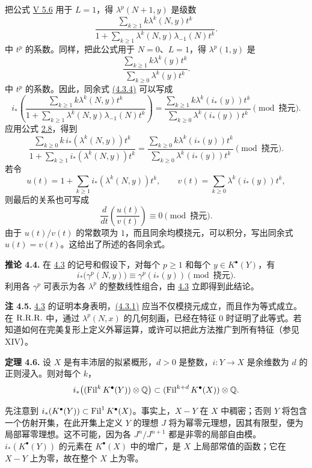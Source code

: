 把公式 \hyperlink{sga6.e05.para.5-6}{V 5.6} 用于 \(L=1\)，得 \(\lambda^p(N+1,y)\) 是级数
\[
  \frac{\sum_{k\ge1}k\lambda^k(N,y)t^k}
       {1+\sum_{k\ge1}\lambda^k(N,y)\lambda_{-1}(N)t^k}.
\]
中 \(t^p\) 的系数。同样，把此公式用于 \(N=0\)、\(L=1\)，得 \(\lambda^p(1,y)\) 是
\[
  \frac{\sum_{k\ge1}k\lambda^k(y)t^k}
       {\sum_{k\ge0}\lambda^k(y)t^k}.
\]
中 \(t^p\) 的系数。因此，同余式 \hyperlink{sga6.e07.eq.4-3-4}{(4.3.4)} 可以写成
\[
i_*\left(
  \frac{\sum_{k\ge1}k\lambda^k(N,y)t^k}
       {1+\sum_{k\ge1}\lambda^k(N,y)\lambda_{-1}(N)t^k}
\right)
=
  \frac{\sum_{k\ge1}k\lambda^k(i_*(y))t^k}
       {\sum_{k\ge0}\lambda^k(i_*(y))t^k}
       \pmod{\text{挠元}}.
\]
应用公式 \hyperlink{sga6.e07.cor.2-8}{2.8}，得到
\[
  \frac{\sum_{k\ge0}k\,i_*(\lambda^k(N,y))t^k}
       {1+\sum_{k\ge1} i_*(\lambda^k(N,y))t^k}
  =
  \frac{\sum_{k\ge0}k\lambda^k(i_*(y))t^k}
       {\sum_{k\ge0}\lambda^k(i_*(y))t^k}
       \pmod{\text{挠元}}.
\]
若令
\[
  u(t)=1+\sum_{k\ge1}i_*(\lambda^k(N,y))t^k,\qquad
  v(t)=\sum_{k\ge0}\lambda^k(i_*(y))t^k,
\]
则最后的关系也可写成
\[
  \frac{d}{dt}\!\left(\frac{u(t)}{v(t)}\right)\equiv0
  \pmod{\text{挠元}}.
\]
由于 \(u(t)/v(t)\) 的常数项为 \(1\)，而且同余均模挠元，可以积分，写出同余式 \(u(t)=v(t)\)。这给出了所述的各同余式。

\textbf{推论 4.4.} 在 \hyperlink{sga6.e07.thm.4-3}{4.3} 的记号和假设下，对每个 \(p\ge1\) 和每个 \(y\in K^\bullet(Y)\)，有
\[
  i_*\bigl(\gamma^p(N,y)\bigr)\equiv \gamma^p(i_*(y))
  \pmod{\text{挠元}}.
\]
利用各 \(\gamma^p\) 可表示为各 \(\lambda^p\) 的整数线性组合，由 \hyperlink{sga6.e07.thm.4-3}{4.3} 立即得到此结论。

\textbf{注 4.5.} \hyperlink{sga6.e07.thm.4-3}{4.3} 的证明本身表明，\hyperlink{sga6.e07.eq.4-3-1}{(4.3.1)} 应当不仅模挠元成立，而且作为等式成立。在 \(\mathrm{R.R.R.}\) 中，通过 \(\lambda^p(N,x)\) 的几何刻画，已经在特征 \(0\) 时证明了此等式。若知道如何在完美复形上定义外幂运算，或许可以把此方法推广到所有特征（参见 XIV）。

\textbf{定理 4.6.} 设 \(X\) 是有丰沛层的拟紧概形，\(d>0\) 是整数，\(i:Y\to X\) 是余维数为 \(d\) 的正则浸入。则对每个 \(k\)，
\[
 i_*\bigl((\operatorname{Fil}^kK^\bullet(Y))\otimes\mathbb Q\bigr)
 \subset
 (\operatorname{Fil}^{k+d}K^\bullet(X))\otimes\mathbb Q.
\]

先注意到 \(i_*(K^\bullet(Y))\subset \operatorname{Fil}^1K^\bullet(X)\)。事实上，\(X-Y\) 在 \(X\) 中稠密；否则 \(Y\) 将包含一个仿射开集，在此开集上定义 \(Y\) 的理想 \(J\) 将为幂零元理想，因其有限型，便为局部幂零理想。这不可能，因为各 \(J^n/J^{n+1}\) 都是非零的局部自由模。\(i_*(K^\bullet(Y))\) 的元素在 \(K^\bullet(X)\) 中的增广，是 \(X\) 上局部常值的函数；它在 \(X-Y\) 上为零，故在整个 \(X\) 上为零。

